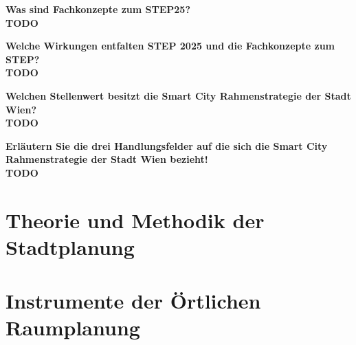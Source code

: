 \documentclass[]{article}
\newenvironment{question}{\vspace{8mm}\noindent\bfseries}{\\}
\begin{document}
\begin{question}
	Was sind Fachkonzepte zum STEP25?
\end{question}
TODO

\begin{question}
	Welche Wirkungen entfalten STEP 2025 und die Fachkonzepte zum STEP?
\end{question}
TODO

\begin{question}
	Welchen Stellenwert besitzt die Smart City Rahmenstrategie der Stadt Wien?
\end{question}
TODO

\begin{question}
	Erläutern Sie die drei Handlungsfelder auf die sich die Smart City Rahmenstrategie der Stadt Wien bezieht!
\end{question}
TODO

\section{Theorie und Methodik der Stadtplanung}

\section{Instrumente der Örtlichen Raumplanung}
\end{document}
